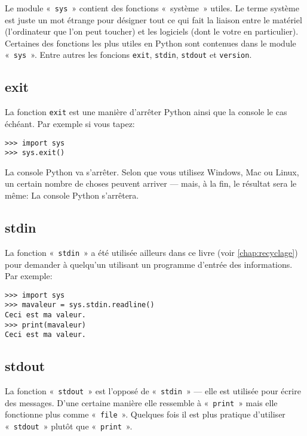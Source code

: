Le module «~\verb+sys+~» contient des fonctions «~système~» utiles. Le terme système est juste un mot étrange pour désigner tout ce qui fait la liaison entre le matériel (l'ordinateur que l'on peut toucher) et les logiciels (dont le votre en particulier). Certaines des fonctions les plus utiles en Python sont contenues dans le module «~\texttt{sys}~». Entre autres les foncions \verb+exit+, \verb+stdin+, \verb+stdout+ et \verb+version+.
\subsection{exit}

La fonction \verb+exit+ est une manière d'arrêter Python ainsi que la console le cas échéant. Par exemple si vous tapez:

\begin{Verbatim}[frame=single,rulecolor=\color{gray}]
>>> import sys
>>> sys.exit()
\end{Verbatim}

La console Python va s'arrêter. Selon que vous utilisez Windows, Mac ou Linux, un certain nombre de choses peuvent arriver --- mais, à la fin, le résultat sera le même: La console Python s'arrêtera.
\subsection{stdin}

La fonction «~\verb+stdin+~» a été utilisée ailleurs dans ce livre (voir \autoref{chap:recyclage}) pour demander à quelqu'un utilisant un programme d'entrée des informations. Par exemple:

\begin{Verbatim}[frame=single,rulecolor=\color{gray}]
>>> import sys
>>> mavaleur = sys.stdin.readline()
Ceci est ma valeur.
>>> print(mavaleur)
Ceci est ma valeur.
\end{Verbatim}
\subsection{stdout}

La fonction «~\verb+stdout+~» est l'opposé de «~\texttt{stdin}~» --- elle est utilisée pour écrire des messages. D'une certaine manière elle ressemble à «~\texttt{print}~» mais elle fonctionne plus comme «~\texttt{file}~». Quelques fois il est plus pratique d'utiliser «~\texttt{stdout}~» plutôt que «~\texttt{print}~».


